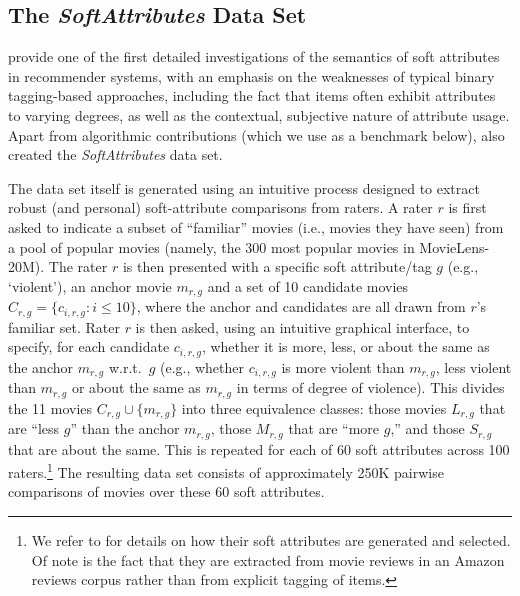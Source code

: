 \documentclass[manuscript,screen,nonacm]{acmart}
\newcommand{\1}{{\mathbf 1}}
\theoremstyle{TheoremNum}
\begin{document}
\subsection{The \emph{SoftAttributes} Data Set}
\label{sec:ratereval_setup}

\citet{sigir21:filipandkristian} provide one of the first detailed investigations of the semantics of soft attributes in recommender systems, with an emphasis on the weaknesses of typical binary tagging-based approaches, including the fact that items often exhibit attributes to varying degrees, as well as the contextual, subjective nature of attribute usage. Apart from algorithmic contributions (which we use as a benchmark below), \citet{sigir21:filipandkristian} also created the \emph{SoftAttributes} data set.

The data set itself is generated using an intuitive process designed to extract robust (and personal) soft-attribute comparisons from raters. A rater $r$ is first asked to indicate a subset of ``familiar'' movies (i.e., movies they have seen) from a pool of popular movies (namely, the 300 most popular movies in MovieLens-20M). The rater $r$ is then presented with a specific soft attribute/tag $g$ (e.g., `violent'), an anchor movie $m_{r,g}$ and a set of 10 candidate movies $C_{r,g} = \{c_{i,r,g} : i\leq 10\}$, where the anchor and candidates are all drawn from $r$'s familiar set. Rater $r$ is then asked, using an intuitive graphical interface, to specify, for each candidate $c_{i,r,g}$, whether it is more, less, or about the same as the anchor $m_{r,g}$ w.r.t.\ $g$ (e.g., whether $c_{i,r,g}$ is more violent than $m_{r,g}$, less violent than $m_{r,g}$ or about the same as $m_{r,g}$ in terms of degree of violence). This divides the 11 movies $C_{r,g} \cup \{m_{r,g}\}$ into three equivalence classes: those movies $L_{r,g}$ that are ``less $g$'' than the anchor $m_{r,g}$, those $M_{r,g}$ that are ``more $g$,'' and those $S_{r,g}$ that are about the same. This is repeated for each of 60 soft attributes across 100 raters.\footnote{We refer to \citet{sigir21:filipandkristian} for details on how their soft attributes are generated and selected. Of note is the fact that they are extracted from movie reviews in an Amazon reviews corpus rather than from explicit tagging of items.} The resulting data set consists of approximately 250K pairwise comparisons of movies over these 60 soft attributes.
\end{document}
